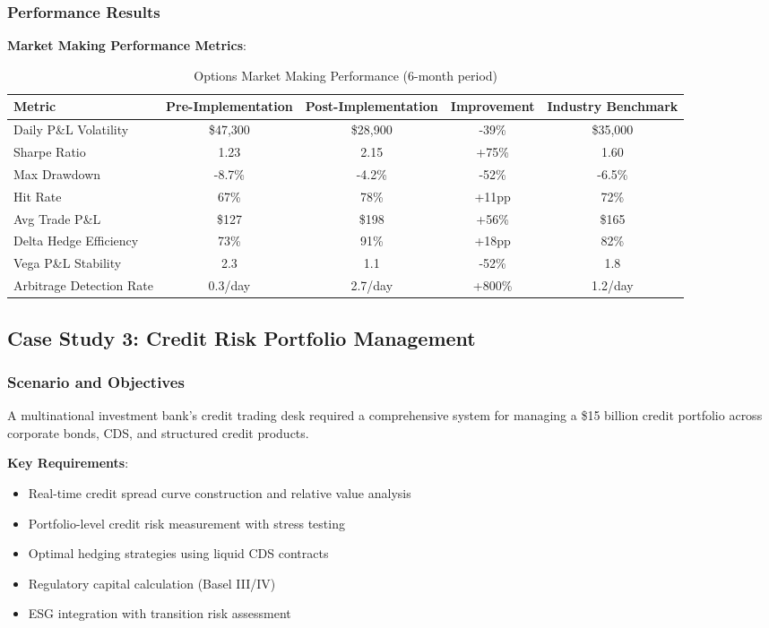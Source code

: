 \documentclass[12pt,a4paper]{article}
\theoremstyle{definition}
\theoremstyle{remark}
\begin{document}
\subsubsection{Performance Results}

\textbf{Market Making Performance Metrics}:

\begin{table}[H]
\centering
\caption{Options Market Making Performance (6-month period)}
\begin{tabular}{@{}lcccc@{}}
\toprule
Metric & Pre-Implementation & Post-Implementation & Improvement & Industry Benchmark \\
\midrule
Daily P\&L Volatility & \$47,300 & \$28,900 & -39\% & \$35,000 \\
Sharpe Ratio & 1.23 & 2.15 & +75\% & 1.60 \\
Max Drawdown & -8.7\% & -4.2\% & -52\% & -6.5\% \\
Hit Rate & 67\% & 78\% & +11pp & 72\% \\
Avg Trade P\&L & \$127 & \$198 & +56\% & \$165 \\
Delta Hedge Efficiency & 73\% & 91\% & +18pp & 82\% \\
Vega P\&L Stability & 2.3 & 1.1 & -52\% & 1.8 \\
Arbitrage Detection Rate & 0.3/day & 2.7/day & +800\% & 1.2/day \\
\bottomrule
\end{tabular}
\end{table}

\subsection{Case Study 3: Credit Risk Portfolio Management}

\subsubsection{Scenario and Objectives}

A multinational investment bank's credit trading desk required a comprehensive system for managing a \$15 billion credit portfolio across corporate bonds, CDS, and structured credit products.

\textbf{Key Requirements}:
\begin{itemize}
    \item Real-time credit spread curve construction and relative value analysis
    \item Portfolio-level credit risk measurement with stress testing
    \item Optimal hedging strategies using liquid CDS contracts
    \item Regulatory capital calculation (Basel III/IV)
    \item ESG integration with transition risk assessment
\end{itemize}
\end{document}
